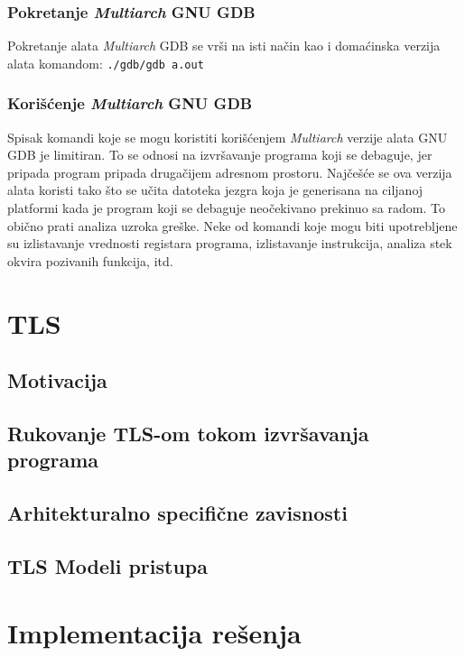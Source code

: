 \documentclass[12pt,oneside]{memoir}
\begin{document}
\subsection{Pokretanje \emph{Multiarch} GNU GDB}

Pokretanje alata \emph{Multiarch} GDB se vrši na isti način kao i domaćinska verzija alata komandom:
\newline
\texttt{./gdb/gdb a.out}

\subsection{Korišćenje \emph{Multiarch} GNU GDB}

Spisak komandi koje se mogu koristiti korišćenjem \emph{Multiarch} verzije alata GNU GDB je limitiran. To se odnosi na izvršavanje programa koji se debaguje, jer pripada program pripada drugačijem adresnom prostoru. Najčešće se ova verzija alata koristi tako što se učita datoteka jezgra koja je generisana na ciljanoj platformi kada je program koji se debaguje neočekivano prekinuo sa radom. To obično prati analiza uzroka greške. Neke od komandi koje mogu biti upotrebljene su izlistavanje vrednosti registara programa, izlistavanje instrukcija, analiza stek okvira pozivanih funkcija, itd.

\chapter{TLS}
\label{chp:TLS}


\section{Motivacija}
\section{Rukovanje TLS-om tokom izvršavanja programa}
\section{Arhitekturalno specifične zavisnosti}
\section{TLS Modeli pristupa}

\chapter{Implementacija rešenja}
\label{chp:Implementacija}
\end{document}
